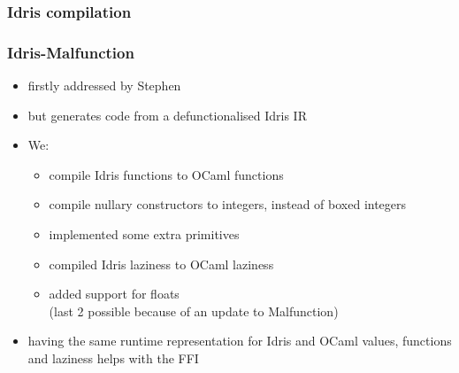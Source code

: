 \documentclass[aspectratio=169]{beamer}
\begin{document}
\begin{frame}
  \frametitle{Idris compilation}
  \centering
\end{frame}

\begin{frame}[t]
  \frametitle{Idris-Malfunction}
  \begin{itemize}
    \item firstly addressed by Stephen
    \item but generates code from a defunctionalised Idris IR
    \item We:
          \begin{itemize}
            \item<2-> compile Idris functions to OCaml functions
            \item<3-> compile nullary constructors to integers, instead of
                  boxed integers
            \item<4-> implemented some extra primitives
            \item<5-> compiled Idris laziness to OCaml laziness
            \item<6-> added support for floats
                  \\ (last 2 possible because of an update to Malfunction)
          \end{itemize}
    \item<7-> having the same runtime representation for Idris and OCaml
          values, functions and laziness helps with the FFI
  \end{itemize}
\end{frame}


\end{document}

